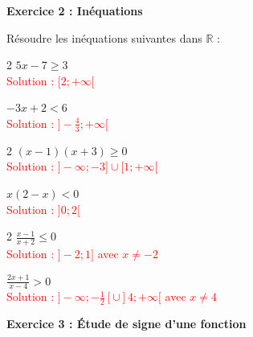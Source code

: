\documentclass[12pt,a4paper]{exam}
\begin{document}
\vspace{10pt}

\noindent
\textbf{Exercice 2 : Inéquations}

\vspace{5pt}
Résoudre les inéquations suivantes dans $\mathbb{R}$ :
\vspace{-5pt}
\begin{questions}
\begin{multicols}{2}
    \question $5x - 7 \ge 3$
    \textcolor{red}{\\Solution : $[2; +\infty[$}

    \question $-3x + 2 < 6$
    \textcolor{red}{\\Solution : $]-\frac{4}{3}; +\infty[$}
\end{multicols}
\vspace{5pt}
\begin{multicols}{2}
    \question $(x-1)(x+3)\ge 0$
    \textcolor{red}{\\Solution : $]-\infty; -3] \cup [1; +\infty[$}

    \question $x(2-x)<0$
    \textcolor{red}{\\Solution : $]0; 2[$}
\end{multicols}
\vspace{5pt}
\begin{multicols}{2}
    \question $\displaystyle \frac{x-1}{x+2} \le 0$
    \textcolor{red}{\\Solution : $]-2; 1]$ avec $x \neq -2$}

    \question $\displaystyle \frac{2x+1}{x-4} > 0$
    \textcolor{red}{\\Solution : $]-\infty; -\frac{1}{2}[ \cup ]4; +\infty[$ avec $x \neq 4$}
\end{multicols}
\end{questions}

\vspace{10pt}

\noindent
\textbf{Exercice 3 : Étude de signe d'une fonction}
\end{document}
